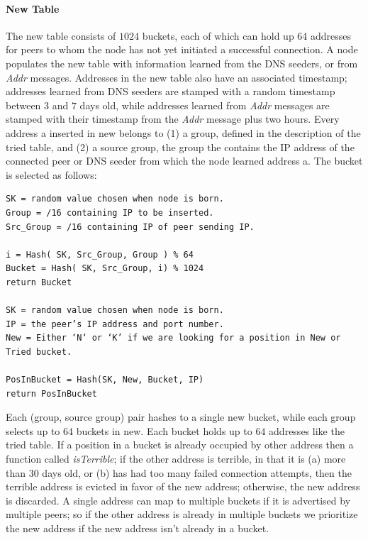 \paragraph*{New Table}
The new table consists of $1024$ buckets, each of which can hold up 64 addresses for peers to whom the node has not yet initiated a successful connection. A node populates the new table with information learned from the DNS seeders, or from \textsl{Addr} messages. Addresses in the new table also have an associated timestamp; addresses learned from DNS seeders are stamped with a random timestamp between $3$ and $7$ days old, while addresses learned from \textsl{Addr} messages are stamped with their timestamp from the \textsl{Addr} message plus two hours.
Every address a inserted in new belongs to (1) a group, defined in the description of the tried table, and (2) a source group, the group the contains the IP address of the connected peer or DNS seeder from which the node learned address a. The bucket is selected as follows:
\begin{verbatim}
SK = random value chosen when node is born.
Group = /16 containing IP to be inserted.
Src_Group = /16 containing IP of peer sending IP.

i = Hash( SK, Src_Group, Group ) % 64
Bucket = Hash( SK, Src_Group, i) % 1024
return Bucket

SK = random value chosen when node is born.
IP = the peer’s IP address and port number.
New = Either ‘N‘ or ‘K’ if we are looking for a position in New or Tried bucket.

PosInBucket = Hash(SK, New, Bucket, IP)
return PosInBucket
\end{verbatim}
Each (group, source group) pair hashes to a single new bucket, while each group selects up to $64$ buckets in new. Each bucket holds up to $64$ addresses like the tried table. If a position in a bucket is already occupied by other address then a function called \textsl{isTerrible}; if the other address is terrible, in that it is (a) more than $30$ days old, or (b) has had too many failed connection attempts, then the terrible address is evicted in favor of the new address; otherwise, the new address is discarded. A single address can map to multiple buckets if it is advertised by multiple peers; so if the other address is already in multiple buckets we prioritize the new address if the new address isn’t already in a bucket.

